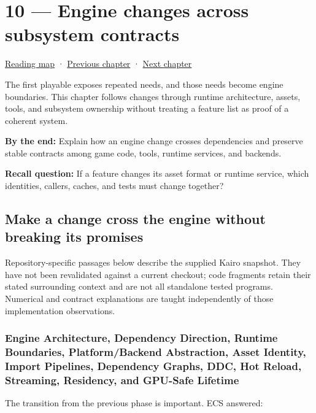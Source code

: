 \hypertarget{05-engine-i-ch010}{}
\section{10 --- Engine changes across subsystem contracts}\label{engine-changes-across-subsystem-contracts}

\href{Chapter\%20Edition/03\%20-\%20Game\%20Engine/00\%20-\%20Reading\%20Map}{Reading map} · \hyperref[05-engine-i-ch009]{Previous chapter} · \hyperref[05-engine-i-ch011]{Next chapter}

The first playable exposes repeated needs, and those needs become engine boundaries. This chapter follows changes through runtime architecture, assets, tools, and subsystem ownership without treating a feature list as proof of a coherent system.

\textbf{By the end:} Explain how an engine change crosses dependencies and preserve stable contracts among game code, tools, runtime services, and backends.

\textbf{Recall question:} If a feature changes its asset format or runtime service, which identities, callers, caches, and tests must change together?

\subsection{Make a change cross the engine without breaking its promises}\label{make-a-change-cross-the-engine-without-breaking-its-promises}

Repository-specific passages below describe the supplied Kairo snapshot. They have not been revalidated against a current checkout; code fragments retain their stated surrounding context and are not all standalone tested programs. Numerical and contract explanations are taught independently of those implementation observations.

\subsubsection{Engine Architecture, Dependency Direction, Runtime Boundaries, Platform/Backend Abstraction, Asset Identity, Import Pipelines, Dependency Graphs, DDC, Hot Reload, Streaming, Residency, and GPU-Safe Lifetime}\label{engine-architecture-dependency-direction-runtime-boundaries-platformbackend-abstraction-asset-identity-import-pipelines-dependency-graphs-ddc-hot-reload-streaming-residency-and-gpu-safe-lifetime}

The transition from the previous phase is important. ECS answered:

